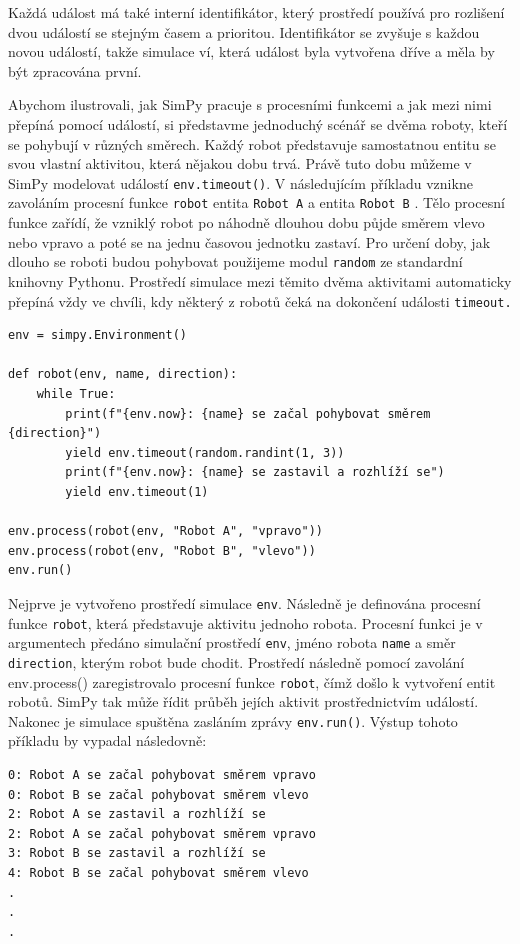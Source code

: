\documentclass[12pt,a4paper]{article}
\begin{document}
Každá událost má také interní identifikátor, který prostředí používá pro rozlišení dvou událostí se stejným časem a prioritou.
Identifikátor se zvyšuje s každou novou událostí, takže simulace ví, která událost byla vytvořena dříve a měla by být zpracována první.

\noindent Abychom ilustrovali, jak SimPy pracuje s procesními funkcemi a jak mezi nimi přepíná pomocí událostí, si představme jednoduchý scénář se dvěma roboty, kteří se pohybují v různých směrech. Každý robot představuje samostatnou entitu se svou vlastní aktivitou, která nějakou dobu trvá. Právě tuto dobu můžeme v SimPy modelovat  událostí \texttt{env.timeout()}. V následujícím příkladu vznikne zavoláním procesní funkce \texttt{robot} entita \texttt{Robot A} a entita \texttt{Robot B} .
Tělo procesní funkce zařídí, že vzniklý robot po náhodně dlouhou dobu půjde směrem vlevo nebo vpravo a poté se na jednu časovou jednotku zastaví. Pro určení doby, jak dlouho se roboti budou pohybovat použijeme modul \texttt{random} ze standardní knihovny Pythonu. Prostředí simulace mezi těmito dvěma aktivitami automaticky přepíná vždy ve chvíli, kdy některý z robotů čeká na dokončení události \texttt{timeout.}

 \begin{verbatim} 
env = simpy.Environment()

def robot(env, name, direction):
    while True:
        print(f"{env.now}: {name} se začal pohybovat směrem {direction}")
        yield env.timeout(random.randint(1, 3))
        print(f"{env.now}: {name} se zastavil a rozhlíží se")
        yield env.timeout(1)       

env.process(robot(env, "Robot A", "vpravo"))
env.process(robot(env, "Robot B", "vlevo"))
env.run()
\end{verbatim}

\noindent Nejprve je vytvořeno prostředí simulace \texttt{env}. Následně je definována procesní funkce \texttt{robot}, která představuje aktivitu jednoho robota. Procesní funkci je v argumentech předáno simulační prostředí \texttt{env}, jméno robota \texttt{name} a směr \texttt{direction}, kterým robot bude chodit. Prostředí následně pomocí zavolání env.process() zaregistrovalo procesní funkce \texttt{robot}, čímž došlo k vytvoření entit robotů. SimPy tak může řídit průběh jejích aktivit prostřednictvím událostí. Nakonec je simulace spuštěna zasláním zprávy \texttt{env.run()}. Výstup tohoto příkladu by vypadal následovně:

 \begin{verbatim} 
0: Robot A se začal pohybovat směrem vpravo
0: Robot B se začal pohybovat směrem vlevo
2: Robot A se zastavil a rozhlíží se
2: Robot A se začal pohybovat směrem vpravo
3: Robot B se zastavil a rozhlíží se
4: Robot B se začal pohybovat směrem vlevo
.
.
.
\end{verbatim}
\end{document}
